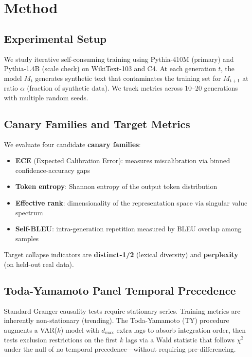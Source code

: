 \documentclass[letterpaper]{article}
\begin{document}
\section{Method}

\subsection{Experimental Setup}

We study iterative self-consuming training using Pythia-410M (primary) and Pythia-1.4B (scale check) on WikiText-103 and C4. At each generation $t$, the model $M_t$ generates synthetic text that contaminates the training set for $M_{t+1}$ at ratio $\alpha$ (fraction of synthetic data). We track metrics across 10--20 generations with multiple random seeds.

\subsection{Canary Families and Target Metrics}

We evaluate four candidate \textbf{canary families}:
\begin{itemize}
    \item \textbf{ECE} (Expected Calibration Error): measures miscalibration via binned confidence-accuracy gaps
    \item \textbf{Token entropy}: Shannon entropy of the output token distribution
    \item \textbf{Effective rank}: dimensionality of the representation space via singular value spectrum
    \item \textbf{Self-BLEU}: intra-generation repetition measured by BLEU overlap among samples
\end{itemize}

Target collapse indicators are \textbf{distinct-1/2} (lexical diversity) and \textbf{perplexity} (on held-out real data).

\subsection{Toda-Yamamoto Panel Temporal Precedence}

Standard Granger causality tests require stationary series. Training metrics are inherently non-stationary (trending). The Toda-Yamamoto (TY) procedure augments a VAR($k$) model with $d_{\max}$ extra lags to absorb integration order, then tests exclusion restrictions on the first $k$ lags via a Wald statistic that follows $\chi^2$ under the null of no temporal precedence---without requiring pre-differencing.
\end{document}
